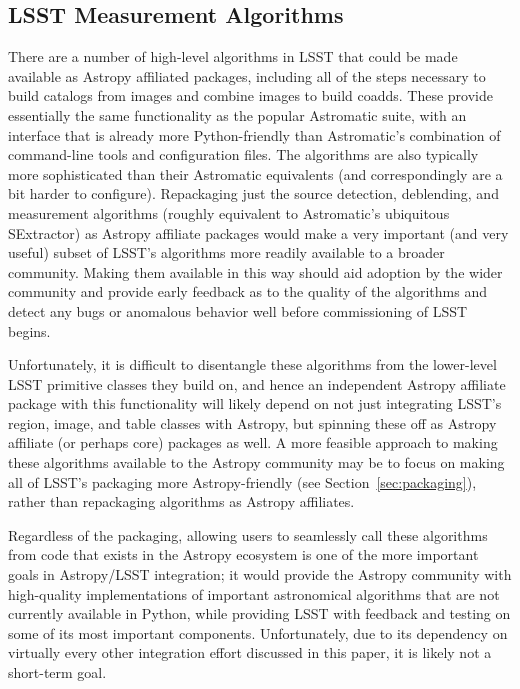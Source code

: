 \documentclass[]{spie}  %
\begin{document}
\subsection{LSST Measurement Algorithms}

There are a number of high-level algorithms in LSST that could be made available as Astropy affiliated packages\cite{bosch_2016_48435}, including all of the steps necessary to build catalogs from images and combine images to build coadds.
These provide essentially the same functionality as the popular Astromatic suite\cite{2012ASSP...29...71B}, with an interface that is already more Python-friendly than Astromatic's combination of command-line tools and configuration files.
The algorithms are also typically more sophisticated than their Astromatic equivalents (and correspondingly are a bit harder to configure).
Repackaging just the source detection, deblending, and measurement algorithms (roughly equivalent to Astromatic's ubiquitous SExtractor) as Astropy affiliate packages would make a very important (and very useful) subset of LSST's algorithms more readily available to a broader community.
Making them available in this way should aid adoption by the wider community and provide early feedback as to the quality of the algorithms and detect any bugs or anomalous behavior well before commissioning of LSST begins.

Unfortunately, it is difficult to disentangle these algorithms from the lower-level LSST primitive classes they build on, and hence an independent Astropy affiliate package with this functionality will likely depend on not just integrating LSST's region, image, and table classes with Astropy, but spinning these off as Astropy affiliate (or perhaps core) packages as well.
A more feasible approach to making these algorithms available to the Astropy community may be to focus on making all of LSST's packaging more Astropy-friendly (see Section~\ref{sec:packaging}), rather than repackaging algorithms as Astropy affiliates.

Regardless of the packaging, allowing users to seamlessly call these algorithms from code that exists in the Astropy ecosystem is one of the more important goals in Astropy/LSST integration; it would provide the Astropy community with high-quality implementations of important astronomical algorithms that are not currently available in Python, while providing LSST with feedback and testing on some of its most important components.
Unfortunately, due to its dependency on virtually every other integration effort discussed in this paper, it is likely not a short-term goal.
\end{document}
